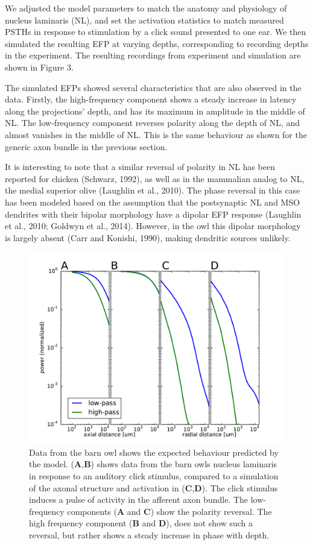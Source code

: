 \documentclass[]{article}
\begin{document}
We adjusted the model parameters to match the anatomy and physiology of
nucleus laminaris (NL), and set the activation statistics to match
measured PSTHs in response to stimulation by a click sound presented to
one ear. We then simulated the resulting EFP at varying depths,
corresponding to recording depths in the experiment. The resulting
recordings from experiment and simulation are shown in Figure 3.

The simulated EFPs showed several characteristics that are also observed
in the data. Firstly, the high-frequency component shows a steady
increase in latency along the projections' depth, and has its maximum in
amplitude in the middle of NL. The low-frequency component reverses
polarity along the depth of NL, and almost vanishes in the middle of NL.
This is the same behaviour as shown for the generic axon bundle in the
previous section.

It is interesting to note that a similar reversal of polarity in NL has
been reported for chicken (Schwarz, 1992), as well as in the mammalian
analog to NL, the medial superior olive (Laughlin et al., 2010). The
phase reversal in this case has been modeled based on the assumption
that the postsynaptic NL and MSO dendrites with their bipolar morphology
have a dipolar EFP response (Laughlin et al., 2010; Goldwyn et al.,
2014). However, in the owl this dipolar morphology is largely absent
(Carr and Konishi, 1990), making dendritic sources unlikely.

\begin{figure}[htbp]
\centering
\includegraphics{../figs/fig_3.pdf}
\caption{Data from the barn owl shows the expected behaviour predicted
by the model. (\textbf{A},\textbf{B}) shows data from the barn owls
nucleus laminaris in response to an auditory click stimulus, compared to
a simulation of the axonal structure and activation in
(\textbf{C},\textbf{D}). The click stimulus induces a pulse of activity
in the afferent axon bundle. The low-frequency components (\textbf{A}
and \textbf{C}) show the polarity reversal. The high frequency component
(\textbf{B} and \textbf{D}), does not show such a reversal, but rather
shows a steady increase in phase with depth.}
\end{figure}
\end{document}
